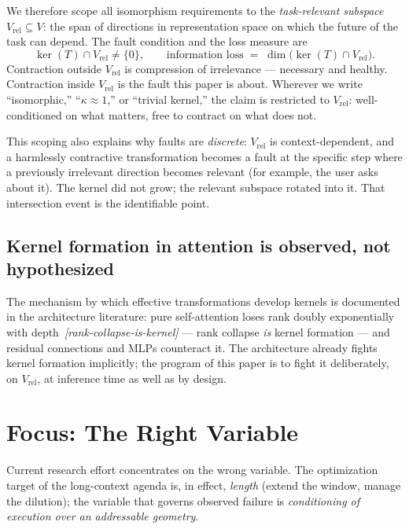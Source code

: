 \documentclass[11pt]{article}
\theoremstyle{remark}
\newif\ifslugs \slugstrue  %
\newcommand{\slug}[1]{\ifslugs\,{\small\textit{[#1]}}\fi}
\newcommand{\Vrel}{V_{\mathrm{rel}}}
\begin{document}
We therefore scope all isomorphism requirements to the \emph{task-relevant subspace}
$\Vrel \subseteq V$: the span of directions in representation space on which the
future of the task can depend. The fault condition and the loss measure are
\begin{equation}
\ker(T) \cap \Vrel \neq \{0\},
\qquad
\text{information loss} \;=\; \dim\!\big(\ker(T) \cap \Vrel\big).
\label{eq:fault}
\end{equation}
Contraction outside $\Vrel$ is compression of irrelevance --- necessary and healthy.
Contraction inside $\Vrel$ is the fault this paper is about. Wherever we write
``isomorphic,'' ``$\kappa \approx 1$,'' or ``trivial kernel,'' the claim is restricted
to $\Vrel$: well-conditioned on what matters, free to contract on what does not.

This scoping also explains why faults are \emph{discrete}: $\Vrel$ is
context-dependent, and a harmlessly contractive transformation becomes a fault at the
specific step where a previously irrelevant direction becomes relevant (for example,
the user asks about it). The kernel did not grow; the relevant subspace rotated into
it. That intersection event is the identifiable point.

\subsection{Kernel formation in attention is observed, not hypothesized}

The mechanism by which effective transformations develop kernels is documented in the
architecture literature: pure self-attention loses rank doubly exponentially with
depth \citep{dong2021attention}\slug{rank-collapse-is-kernel} --- rank collapse \emph{is} kernel formation ---
and residual connections and MLPs counteract it. The architecture already fights
kernel formation implicitly; the program of this paper is to fight it deliberately,
on $\Vrel$, at inference time as well as by design.

\section{Focus: The Right Variable}
\label{sec:focus}

Current research effort concentrates on the wrong variable. The optimization target of the
long-context agenda is, in effect, \emph{length} (extend the window, manage the
dilution); the variable that governs observed failure is \emph{conditioning of
execution over an addressable geometry}.
\end{document}
